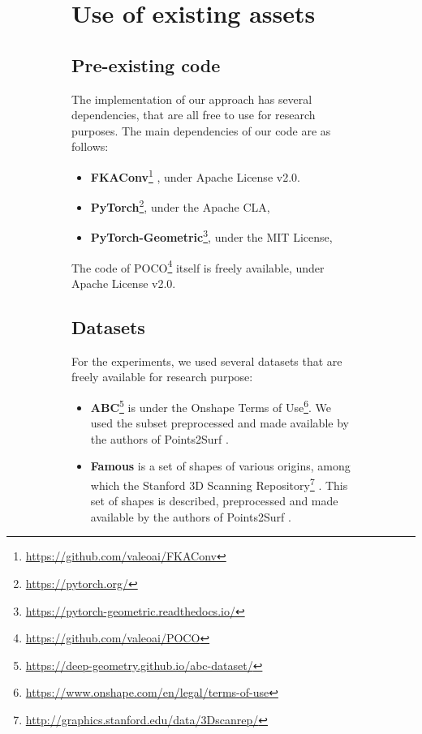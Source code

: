 \documentclass[10pt,twocolumn,letterpaper]{article}
\newcommand\OURS{{POCO}}
\newcommand{\footnoteref}[1]{}
\begin{document}
\begin{figure}[t]
\begin{figure}[t]
\FloatBarrier

\section{Use of existing assets}

\subsection{Pre-existing code}

The implementation of our approach has several dependencies, that are all free to use for research purposes. The main dependencies of our code are as follows:
\begin{itemize}[itemsep=4pt,topsep=4pt, parsep=0pt]

    \item \textbf{FKAConv}\footnote{\label{foot:fkaconv}\url{https://github.com/valeoai/FKAConv}} \cite{Boulch2020ACCV}, under Apache License v2.0.

    \item \textbf{PyTorch}\footnote{\label{foot:pytorch}\url{https://pytorch.org/}}, under the Apache CLA,

    \item \textbf{PyTorch-Geometric}\footnote{\label{foot:pytorchgeom}\url{https://pytorch-geometric.readthedocs.io/}}, under the MIT License,

\end{itemize}
The code of {\OURS}\footnote{\url{https://github.com/valeoai/POCO}} itself is freely available, under Apache License v2.0.

\subsection{Datasets}\label{sec:assetsdatasets}

For the experiments, we used several datasets that are freely available for research purpose:
\begin{itemize}[itemsep=4pt,topsep=4pt, parsep=0pt]

    \item \textbf{ABC}\footnote{\label{foot:abc}\url{https://deep-geometry.github.io/abc-dataset/}} is under the Onshape Terms of Use\footnote{\url{https://www.onshape.com/en/legal/terms-of-use}}. We used the subset preprocessed and made available by the authors of Points2Surf\footnoteref{foot:points2surf} \cite{Erler2020Points2Surf}.
    
    \item \textbf{Famous} is a set of shapes of various origins, among which the Stanford 3D Scanning Repository\footnote{\url{http://graphics.stanford.edu/data/3Dscanrep/}} \cite{krishnamurthy1996fitting}. This set of shapes is described, preprocessed and made available by the authors of Points2Surf\footnoteref{foot:points2surf} \cite{Erler2020Points2Surf}.


\end{itemize}
\end{figure}
\end{figure}
\end{document}
